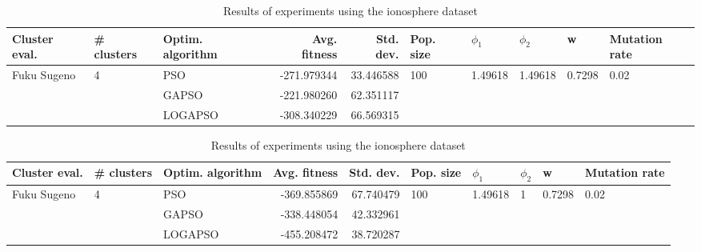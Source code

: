 \documentclass{article}
\begin{document}
\begin{table}
\centering
\caption{Results of experiments using the ionosphere dataset}
\begin{tabular}{lllrrlllll}
\toprule
               Cluster eval. &        \# clusters & Optim. algorithm &  Avg. fitness &  Std. dev. &            Pop. size &               $\phi_{1}$ &               $\phi_{2}$ &                       w &         Mutation rate \\
\midrule
\multirow{3}{*}{Fuku Sugeno} & \multirow{3}{*}{4} &              PSO &   -271.979344 &  33.446588 & \multirow{3}{*}{100} & \multirow{3}{*}{1.49618} & \multirow{3}{*}{1.49618} & \multirow{3}{*}{0.7298} & \multirow{3}{*}{0.02} \\
                             &                    &            GAPSO &   -221.980260 &  62.351117 &                      &                          &                          &                         &                       \\
                             &                    &          LOGAPSO &   -308.340229 &  66.569315 &                      &                          &                          &                         &                       \\
\bottomrule
\end{tabular}
\end{table}
\begin{table}
\centering
\caption{Results of experiments using the ionosphere dataset}
\begin{tabular}{lllrrlllll}
\toprule
               Cluster eval. &        \# clusters & Optim. algorithm &  Avg. fitness &  Std. dev. &            Pop. size &               $\phi_{1}$ &         $\phi_{2}$ &                       w &         Mutation rate \\
\midrule
\multirow{3}{*}{Fuku Sugeno} & \multirow{3}{*}{4} &              PSO &   -369.855869 &  67.740479 & \multirow{3}{*}{100} & \multirow{3}{*}{1.49618} & \multirow{3}{*}{1} & \multirow{3}{*}{0.7298} & \multirow{3}{*}{0.02} \\
                             &                    &            GAPSO &   -338.448054 &  42.332961 &                      &                          &                    &                         &                       \\
                             &                    &          LOGAPSO &   -455.208472 &  38.720287 &                      &                          &                    &                         &                       \\
\bottomrule
\end{tabular}
\end{table}
\end{document}

